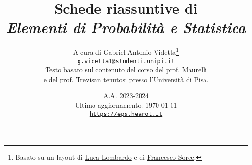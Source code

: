 \documentclass[10pt]{report}
\title{\Huge{Schede riassuntive di \\ \textit{Elementi di Probabilità e Statistica}}}
\date{A.A. 2023-2024 \\[0.6in] Ultimo aggiornamento: \today \\[1in] \href{https://eps.hearot.it}{\texttt{https://eps.hearot.it}}}
\author{A cura di Gabriel Antonio Videtta\footnote{Basato su un layout di \underline{Luca Lombardo} e di \underline{Francesco Sorce}.} \\ \href{mailto:g.videtta1@studenti.unipi.it}{\texttt{g.videtta1@studenti.unipi.it}} \\[0.3in] Testo basato sul contenuto del corso del prof. Maurelli \\ e del prof. Trevisan tenutosi presso l'Università di Pisa.}
\begin{document}
\maketitle

\begin{multicols*}{2}
    \tableofcontents
\end{multicols*}

\newpage









\end{document}
